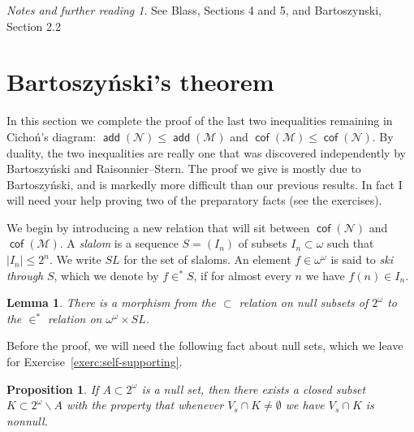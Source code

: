 \documentclass[11pt,oneside]{amsbook}
\newcommand{\Null}{\mathcal N}
\newcommand{\Meager}{\mathcal M}
\DeclareMathOperator{\add}{\mathsf{add}}
\DeclareMathOperator{\cof}{\mathsf{cof}}
\theoremstyle{definition}
\theoremstyle{plain}
\newtheorem{lemma}[theorem]{Lemma}
\newtheorem{proposition}[theorem]{Proposition}
\theoremstyle{definition}
\theoremstyle{remark}
\newtheorem*{notes}{Notes and further reading}
\numberwithin{equation}{section}
\numberwithin{figure}{section}
\begin{document}
\begin{notes}
  See Blass, Sections 4 and 5, and Bartoszynski, Section 2.2
\end{notes}


\newpage
\section{Bartoszy\'nski's theorem}

In this section we complete the proof of the last two inequalities remaining in Cicho\'n's diagram: $\add(\Null)\leq\add(\Meager)$ and $\cof(\Meager)\leq\cof(\Null)$. By duality, the two inequalities are really one that was discovered independently by Bartoszy\'nski and Raisonnier--Stern. The proof we give is mostly due to Bartoszy\'nski, and is markedly more difficult than our previous results. In fact I will need your help proving two of the preparatory facts (see the exercises).

We begin by introducing a new relation that will sit between $\cof(\Null)$ and $\cof(\Meager)$. A \emph{slalom} is a sequence $S=(I_n)$ of subsets $I_n\subset\omega$ such that $|I_n|\leq2^n$. We write $SL$ for the set of slaloms. An element $f\in\omega^\omega$ is said to \emph{ski through} $S$, which we denote by $f\in^*S$, if for almost every $n$ we have $f(n)\in I_n$.

\begin{lemma}
  \label{lem:null-slalom}
  There is a morphism from the $\subset$ relation on null subsets of $2^\omega$ to the $\in^*$ relation on $\omega^\omega\times SL$.
\end{lemma}

Before the proof, we will need the following fact about null sets, which we leave for Exercise~\ref{exerc:self-supporting}.

\begin{proposition}
  \label{prop:self-supporting}
  If $A\subset2^\omega$ is a null set, then there exists a closed subset $K\subset2^\omega\smallsetminus A$ with the property that whenever $V_s\cap K\neq\emptyset$ we have $V_s\cap K$ is nonnull.
\end{proposition}
\end{document}

